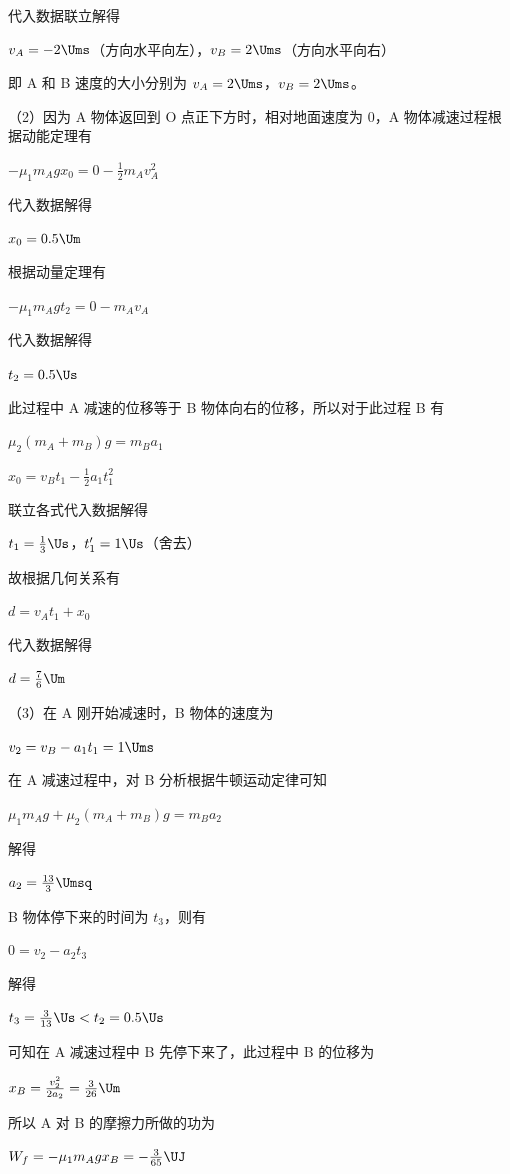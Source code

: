 \documentclass[\gkver]{gaokaozhenti}
\begin{document}
\begin{enumerate}
{代入数据联立解得

$v_{A} = -2 \Ums$（方向水平向左），$v_{B} = 2 \Ums$（方向水平向右）

即 A 和 B 速度的大小分别为 $v_{A} = 2 \Ums$，$v_{B} = 2 \Ums$。

（2）因为 A 物体返回到 O 点正下方时，相对地面速度为 0，A 物体减速过程根据动能定理有

$-\mu_{1}m_{A}gx_{0} = 0 - \frac{1}{2}m_{A}v_{A}^{2}$

代入数据解得

$x_{0} = 0.5 \Um$

根据动量定理有

$-\mu_{1}m_{A}gt_{2} = 0 - m_{A}v_{A}$

代入数据解得

$t_{2} = 0.5 \Us$

此过程中 A 减速的位移等于 B 物体向右的位移，所以对于此过程 B 有

$\mu_{2}(m_{A} + m_{B})g = m_{B}a_{1}$

$x_{0} = v_{B}t_{1} - \frac{1}{2}a_{1}t_{1}^{2}$

联立各式代入数据解得

$t_{1} = \frac{1}{3} \Us$，$t_{1}' = 1 \Us$（舍去）

故根据几何关系有

$d = v_{A}t_{1} + x_{0}$

代入数据解得

$d = \frac{7}{6} \Um$

（3）在 A 刚开始减速时，B 物体的速度为

$v_{2} = v_{B} - a_{1}t_{1} = 1 \Ums$

在 A 减速过程中，对 B 分析根据牛顿运动定律可知

$\mu_{1}m_{A}g + \mu_{2}(m_{A} + m_{B})g = m_{B}a_{2}$

解得

$a_{2} = \frac{13}{3} \Umsq$

B 物体停下来的时间为 $t_{3}$，则有

$0 = v_{2} - a_{2}t_{3}$

解得

$t_{3} = \frac{3}{13} \Us < t_{2} = 0.5 \Us$

可知在 A 减速过程中 B 先停下来了，此过程中 B 的位移为

$x_{B} = \frac{v_{2}^{2}}{2a_{2}} = \frac{3}{26} \Um$

所以 A 对 B 的摩擦力所做的功为

$W_{f} = -\mu_{1}m_{A}gx_{B} = -\frac{3}{65} \UJ$

}
\end{enumerate}
\end{document}
